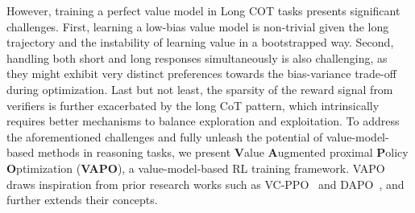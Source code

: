 However, training a perfect value model in Long COT tasks presents significant challenges.
First, learning a low-bias value model is non-trivial given the long trajectory and the instability of learning value in a bootstrapped way. Second, handling both short and long responses simultaneously is also challenging, as they might exhibit very distinct preferences towards the bias-variance trade-off during optimization. Last but not least, the sparsity of the reward signal from verifiers is further exacerbated by the long CoT pattern, which intrinsically requires better mechanisms to balance exploration and exploitation. To address the aforementioned challenges and fully unleash the potential of value-model-based methods in reasoning tasks, we present \textbf{V}alue \textbf{A}ugmented proximal \textbf{P}olicy \textbf{O}ptimization (\textbf{VAPO}), a value-model-based RL training framework. VAPO draws inspiration from prior research works such as VC-PPO~\cite{vc-ppo} and DAPO~\cite{dapo}, and further extends their concepts.

